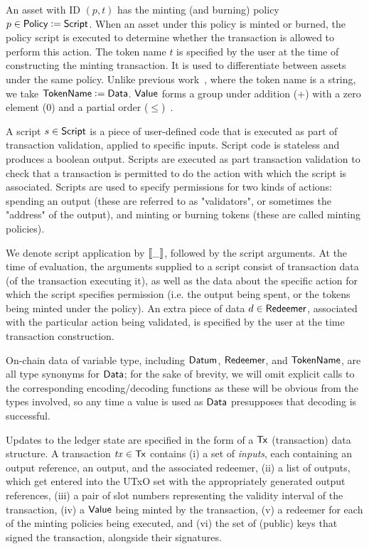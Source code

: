 An asset with ID $(p, t)$ has the minting (and burning) policy
$p \in \textsf{Policy} \mathrel{\mathop:}= \textsf{Script}$. When an asset under this policy is minted or
burned, the policy script is executed to determine whether the transaction
is allowed to perform this action. The token name $t$ is specified by the user
at the time of constructing the minting transaction. It is used to differentiate
between assets under the same policy. Unlike previous work~\cite{eutxoma,structured},
where the token name is a string, we take $\mathsf{TokenName} \mathrel{\mathop:}= \mathsf{Data}$.
$\mathsf{Value}$ forms a group under addition ($+$) with a zero element ($0$)
and a partial order ($\leq$)~\cite{utxoma}.

A script $s \in \textsf{Script}$ is a piece of user-defined code that is executed as
part of transaction validation, applied to specific inputs.
Script code is stateless and produces a boolean output.
Scripts are executed as part transaction validation to check
that a transaction is permitted to do the action with which the script is associated.
Scripts are used to specify permissions for two kinds of actions: spending an output (these
are referred to as "validators", or sometimes the "address" of the output), and
minting or burning tokens (these are called minting policies).

We denote script application by
$\llbracket\_\rrbracket$, followed by the script arguments.
At the time of evaluation,
the arguments supplied to a script consist of transaction data (of the transaction
executing it), as well as the data about the specific action for which
the script specifies permission (i.e. the output being spent, or the tokens
being minted under the policy). An extra piece of data $d \in \mathsf{Redeemer}$, associated
with the particular action being validated, is specified by the user
at the time transaction construction.

On-chain data of variable type, including $\mathsf{Datum}$, $\mathsf{Redeemer}$, and $\mathsf{TokenName}$,
are all type synonyms for $\mathsf{Data}$;
for the sake of brevity,
we will omit explicit calls to the corresponding encoding/decoding functions
as these will be obvious from the types involved,
so any time a value is used as $\mathsf{Data}$ presupposes that decoding is successful.

Updates to the ledger state are specified in the form of a $\mathsf{Tx}$ (transaction) data structure.
A transaction $\mathit{tx} \in \mathsf{Tx}$
contains (i) a set of \emph{inputs}, each containing an output reference, an output,
and the associated redeemer, (ii) a list of outputs, which get entered into the
UTxO set with the appropriately generated output references, (iii) a pair of slot
numbers representing the validity interval of the transaction, (iv) a $\mathsf{Value}$ being
minted by the transaction, (v) a redeemer for each
of the minting policies being executed, and (vi) the set of (public) keys that signed the
transaction, alongside their signatures.

